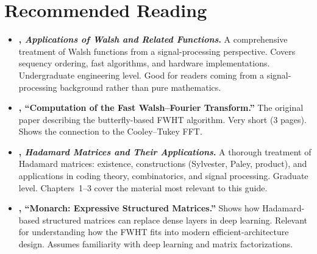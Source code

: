 \section*{Recommended Reading}

\begin{itemize}
  \item \textbf{\citet{beauchamp1984walsh}, \emph{Applications of Walsh
    and Related Functions}.}
    A comprehensive treatment of Walsh functions from a
    signal-processing perspective. Covers sequency ordering, fast
    algorithms, and hardware implementations. Undergraduate engineering
    level. Good for readers coming from a signal-processing background
    rather than pure mathematics.

  \item \textbf{\citet{shanks1969computation}, ``Computation of the Fast
    Walsh--Fourier Transform.''}
    The original paper describing the butterfly-based FWHT algorithm.
    Very short (3 pages). Shows the connection to the Cooley--Tukey FFT.

  \item \textbf{\citet{horadam2007hadamard}, \emph{Hadamard Matrices and
    Their Applications}.}
    A thorough treatment of Hadamard matrices: existence, constructions
    (Sylvester, Paley, product), and applications in coding theory,
    combinatorics, and signal processing. Graduate level. Chapters~1--3
    cover the material most relevant to this guide.

  \item \textbf{\citet{dao2022monarch}, ``Monarch: Expressive Structured
    Matrices.''}
    Shows how Hadamard-based structured matrices can replace dense
    layers in deep learning. Relevant for understanding how the FWHT
    fits into modern efficient-architecture design. Assumes familiarity
    with deep learning and matrix factorizations.
\end{itemize}
